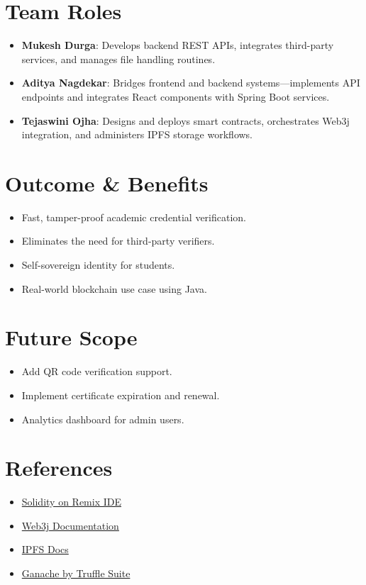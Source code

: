 \documentclass[12pt]{article}
\begin{document}
\section*{Team Roles}
\begin{itemize}
  \item \textbf{Mukesh Durga}: Develops backend REST APIs, integrates third-party services, and manages file handling routines.
  \item \textbf{Aditya Nagdekar}: Bridges frontend and backend systems—implements API endpoints and integrates React components with Spring Boot services.
  \item \textbf{Tejaswini Ojha}: Designs and deploys smart contracts, orchestrates Web3j integration, and administers IPFS storage workflows.
\end{itemize}

\section*{Outcome \& Benefits}
\begin{itemize}
  \item Fast, tamper-proof academic credential verification.
  \item Eliminates the need for third-party verifiers.
  \item Self-sovereign identity for students.
  \item Real-world blockchain use case using Java.
\end{itemize}

\section*{Future Scope}
\begin{itemize}
  \item Add QR code verification support.
  \item Implement certificate expiration and renewal.
  \item Analytics dashboard for admin users.
\end{itemize}

\section*{References}
\begin{itemize}
  \item \href{https://remix.ethereum.org}{Solidity on Remix IDE}
  \item \href{https://docs.web3j.io/}{Web3j Documentation}
  \item \href{https://docs.ipfs.tech/}{IPFS Docs}
  \item \href{https://trufflesuite.com/ganache/}{Ganache by Truffle Suite}
\end{itemize}
\end{document}
